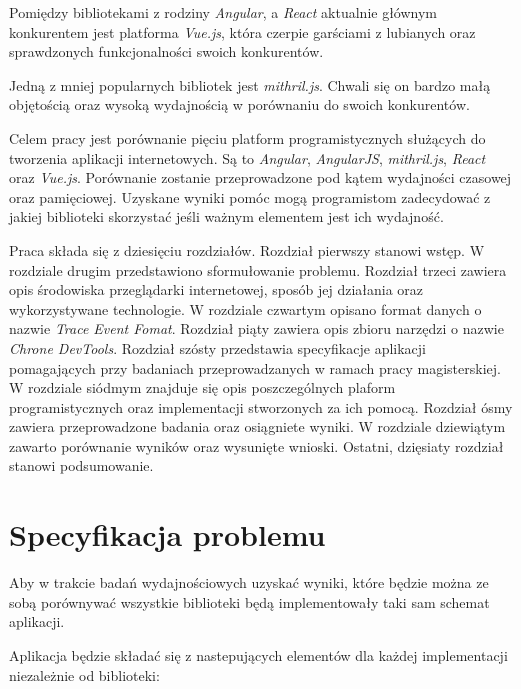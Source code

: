 \documentclass[polish, twoside, 12pt]{mwart}
\let\stdsection\section
\renewcommand*{\section}{\clearpage\stdsection}
\begin{document}
Pomiędzy bibliotekami z rodziny \emph{Angular}, a \emph{React} aktualnie głównym konkurentem jest platforma \emph{Vue.js}, która czerpie garściami z lubianych oraz sprawdzonych funkcjonalności swoich konkurentów.

Jedną z mniej popularnych bibliotek jest \emph{mithril.js}. Chwali się on bardzo małą objętością oraz wysoką wydajnością w porównaniu do swoich konkurentów.

Celem pracy jest porównanie pięciu platform programistycznych służących do tworzenia aplikacji internetowych. Są to \emph{Angular}, \emph{AngularJS},
\emph{mithril.js}, \emph{React} oraz \emph{Vue.js}. Porównanie zostanie przeprowadzone pod kątem wydajności czasowej oraz pamięciowej. Uzyskane wyniki pomóc mogą programistom zadecydować z jakiej biblioteki skorzystać jeśli ważnym elementem jest ich wydajność.

Praca składa się z dziesięciu rozdziałów. Rozdział pierwszy stanowi wstęp. W rozdziale drugim przedstawiono sformułowanie problemu. Rozdział trzeci zawiera opis środowiska przeglądarki internetowej, sposób jej działania oraz wykorzystywane technologie. W rozdziale czwartym opisano format danych o nazwie \emph{Trace Event Fomat}. Rozdział piąty zawiera opis zbioru narzędzi o nazwie \emph{Chrone DevTools}. Rozdział szósty przedstawia specyfikacje aplikacji pomagających przy badaniach przeprowadzanych w ramach pracy magisterskiej. W rozdziale siódmym znajduje się opis poszczególnych plaform programistycznych oraz implementacji stworzonych za ich pomocą. Rozdział ósmy zawiera przeprowadzone badania oraz osiągniete wyniki. W rozdziale dziewiątym zawarto porównanie wyników oraz wysunięte wnioski. Ostatni, dzięsiaty rozdział stanowi podsumowanie.

\section{Specyfikacja problemu}

Aby w trakcie badań wydajnościowych uzyskać wyniki, które będzie można ze sobą porównywać wszystkie biblioteki będą implementowały taki sam schemat aplikacji.

Aplikacja będzie składać się z nastepujących elementów dla każdej implementacji niezależnie od biblioteki:
\end{document}
